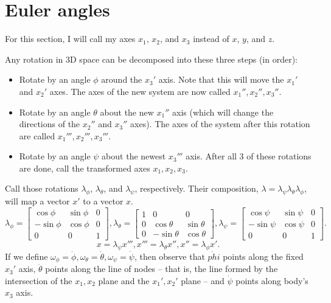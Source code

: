 \documentclass{article}
\begin{document}
\section{Euler angles}
For this section, I will call my axes $x_1$, $x_2$, and $x_3$ instead of $x$, $y$, and $z$.
\par
Any rotation in 3D space can be decomposed into these three steps (in order):
\begin{itemize}
    \item Rotate by an angle $\phi$ around the $x_3'$ axis. Note that this will move the $x_1'$ and $x_2'$ axes. The axes of the new system are now called $x_1'', x_2'', x_3''$.
    \item Rotate by an angle $\theta$ about the new $x_1''$ axis (which will change the directions of the $x_2''$ and $x_3''$ axes). The axes of the system after this rotation are called $x_1''', x_2''', x_3'''$.
    \item Rotate by an angle $\psi$ about the newest $x_3'''$ axis. After all 3 of these rotations are done, call the transformed axes $x_1, x_2, x_3$.
\end{itemize}
Call those rotations $\lambda_\phi$, $\lambda_\theta$, and $\lambda_\psi$, respectively. Their composition, $\lambda=\lambda_\psi \lambda_\theta \lambda_\phi$, will map a vector $x'$ to a vector $x$.
\[ \lambda_\phi = \begin{bmatrix}
    \cos \phi & \sin \phi & 0 \\
    -\sin \phi & \cos \phi & 0 \\
    0 & 0 & 1
\end{bmatrix}, \lambda_\theta = \begin{bmatrix}
    1 & 0 & 0 \\
    0 & \cos \theta & \sin \theta \\
    0 & -\sin \theta & \cos \theta
\end{bmatrix}, \lambda_\psi = \begin{bmatrix}
    \cos \psi & \sin \psi & 0 \\
    -\sin \psi & \cos \psi & 0 \\
    0 & 0 & 1
\end{bmatrix}. \]
\[ x = \lambda_\psi x''', x''' = \lambda_\theta x'', x'' = \lambda_\phi x'. \]
If we define $\omega_\phi = \dot{\phi}, \omega_\theta = \dot{\theta}, \omega_\psi=\dot{\psi}$, then observe that $\dot{phi}$ points along the fixed $x_3'$ axis, $\dot{\theta}$ points along the line of nodes -- that is, the line formed by the intersection of the $x_1,x_2$ plane and the $x_1',x_2'$ plane -- and $\dot{\psi}$ points along body's $x_3$ axis.
\end{document}
